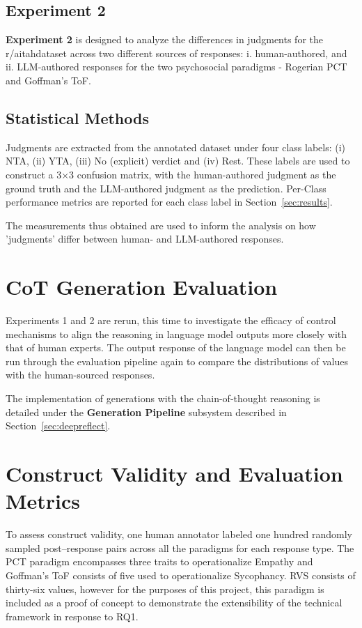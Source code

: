 \subsection{Experiment 2}
\textbf{Experiment 2} is designed to analyze the differences in judgments for the r/aitahdataset across two different sources of responses: i. human-authored, and ii. LLM-authored responses for the two psychosocial paradigms - Rogerian PCT and Goffman's ToF.


\subsection{Statistical Methods}

Judgments are extracted from the annotated dataset under four class labels: (i) NTA, (ii) YTA, (iii) No (explicit) verdict and (iv) Rest. These labels are used to construct a 3×3 confusion matrix, with the human-authored judgment as the ground truth and the LLM-authored judgment as the prediction. Per-Class performance metrics are reported for each class label in Section~\ref{sec:results}.

The measurements thus obtained are used to inform the analysis on how 'judgments' differ between human- and LLM-authored responses.

\section{CoT Generation Evaluation}
Experiments 1 and 2 are rerun, this time to investigate the efficacy of control mechanisms to align the reasoning in language model outputs more closely with that of human experts. The output response of the language model can then be run through the evaluation pipeline again to compare the distributions of values with the human-sourced responses.

The implementation of generations with the chain-of-thought reasoning is detailed under the \textbf{Generation Pipeline} subsystem described in Section~\ref{sec:deepreflect}.

\section{Construct Validity and Evaluation Metrics}
To assess construct validity, one human annotator labeled one hundred randomly sampled post–response pairs across all the paradigms for each response type. The PCT paradigm encompasses three traits to operationalize Empathy and Goffman’s ToF consists of five used to operationalize Sycophancy. RVS consists of thirty-six values, however for the purposes of this project, this paradigm is included as a proof of concept to demonstrate the extensibility of the technical framework in response to RQ1.

